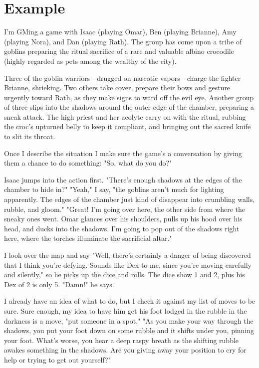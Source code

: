 \chapter{Example}
 



I'm GMing a game with Isaac (playing Omar), Ben (playing Brianne), Amy (playing Nora), and Dan (playing Rath). The group has come upon a tribe of goblins preparing the ritual sacrifice of a rare and valuable albino crocodile (highly regarded as pets among the wealthy of the city).

 

Three of the goblin warriors—drugged on narcotic vapors—charge the fighter Brianne, shrieking. Two others take cover, prepare their bows and gesture urgently toward Rath, as they make signs to ward off the evil eye. Another group of three slips into the shadows around the outer edge of the chamber, preparing a sneak attack. The high priest and her acolyte carry on with the ritual, rubbing the croc's upturned belly to keep it compliant, and bringing out the sacred knife to slit its throat.

 

Once I describe the situation I make sure the game's a conversation by giving them a chance to do something: "So, what do you do?"

 

Isaac jumps into the action first. "There's enough shadows at the edges of the chamber to hide in?" "Yeah," I say, "the goblins aren't much for lighting apparently. The edges of the chamber just kind of disappear into crumbling walls, rubble, and gloom." "Great! I'm going over here, the other side from where the sneaky ones went. Omar glances over his shoulders, pulls up his hood over his head, and ducks into the shadows. I'm going to pop out of the shadows right here, where the torches illuminate the sacrificial altar."

 

I look over the map and say "Well, there's certainly a danger of being discovered that I think you're defying. Sounds like Dex to me, since you're moving carefully and silently," so he picks up the dice and rolls. The dice show 1 and 2, plus his Dex of 2 is only 5. "Damn!" he says.

 

I already have an idea of what to do, but I check it against my list of moves to be sure. Sure enough, my idea to have him get his foot lodged in the rubble in the darkness is a move, "put someone in a spot." "As you make your way through the shadows, you put your foot down on some rubble and it shifts under you, pinning your foot. What's worse, you hear a deep raspy breath as the shifting rubble awakes something in the shadows. Are you giving away your position to cry for help or trying to get out yourself?"

